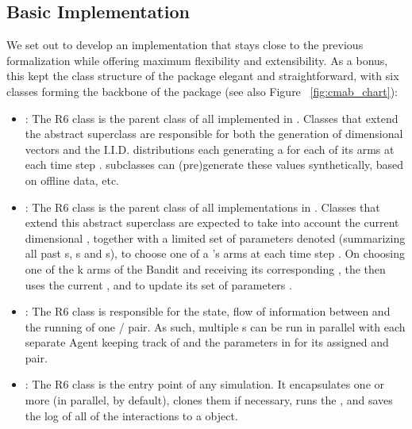 \documentclass[nojss]{jss}\usepackage[]{graphicx}\usepackage[]{color}
\begin{document}
\subsection{Basic Implementation}

We set out to develop an implementation that stays close to the previous formalization while offering maximum flexibility and extensibility. As a bonus, this kept the class structure of the package elegant and straightforward, with six classes forming the backbone of the package (see also Figure ~\ref{fig:cmab_chart}):

\begin{itemize}
         \item {}: The R6 class  is the parent class of all  implemented in . Classes that extend the abstract superclass  are responsible for both the generation of  dimensional  vectors  and the  I.I.D. distributions each generating a  for each of its  arms at each time step .  subclasses can (pre)generate these values synthetically, based on offline data, etc.

         \item {}: The R6 class  is the parent class of all  implementations in . Classes that extend this abstract  superclass are expected to take into account the current  dimensional , together with a limited set of parameters denoted  (summarizing all past s, s and s\footnotemark), to choose one of a 's arms at each time step . On choosing one of the {k} arms of the Bandit and receiving its corresponding , the  then uses the current ,  and  to update its set of parameters .

         \item {}: The R6 class  is responsible for the state, flow of information between and the running of one / pair. As such, multiple s can be run in parallel with each separate Agent keeping track of  and the parameters in  for its assigned  and  pair.

         \item {}: The R6 class  is the entry point of any  simulation. It encapsulates one or more  (in parallel, by default), clones them if necessary, runs the , and saves the log of all of the  interactions to a  object.


\end{itemize}
\end{document}
